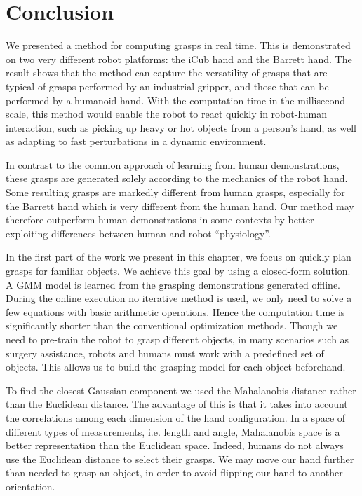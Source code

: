 \section{Conclusion}
\label{cha3:sec6}

We presented a method for computing grasps in real time. This is demonstrated on two very different robot platforms: the iCub hand and the Barrett hand. The result shows that the method can capture the versatility of grasps that are typical of grasps performed by an industrial gripper, and those that can be performed by a humanoid hand.
With the computation time in the millisecond scale,
this method would enable the robot to react quickly in robot-human interaction, such as picking up heavy or hot objects from a person's hand, as well as adapting to fast perturbations in a dynamic environment.

In contrast to the common approach of learning from human demonstrations,
these grasps are generated solely according to the mechanics of the robot hand.
Some resulting grasps are markedly different from human grasps, especially for the Barrett hand which is very different from the human hand.
Our method may therefore outperform human demonstrations in some
contexts by better exploiting differences between human and robot ``physiology''.

In the first part of the work we present in this chapter, we focus on quickly plan grasps for familiar objects.
We achieve this goal by using a closed-form solution.
A GMM model is learned from the grasping demonstrations generated offline. During the online execution no iterative method is used, we only need to solve a few equations with basic arithmetic operations. Hence the computation time is significantly shorter than the conventional optimization methods. Though we need to pre-train the robot to grasp different objects, in many scenarios such as surgery assistance, robots and humans must work with a predefined set of objects. This allows us to build the grasping model for each object beforehand.

To find the closest Gaussian component we used the Mahalanobis distance rather than the Euclidean distance. The advantage of this is that it takes into account the correlations among each dimension of the hand configuration. In a space of different types of measurements, i.e. length and angle, Mahalanobis space is a better representation than the Euclidean space. Indeed, humans do not always use the Euclidean distance to select their grasps. We may move our hand further than needed to grasp an object, in order to avoid flipping our hand to another orientation.

